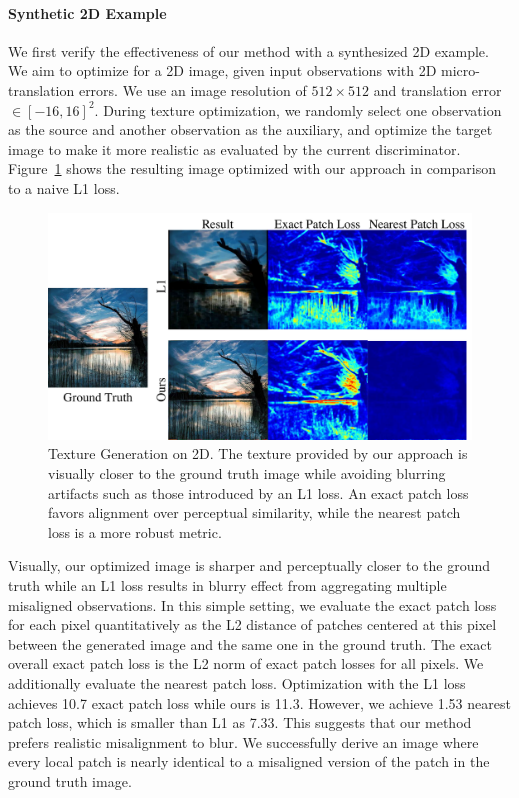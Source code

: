 \paragraph*{Synthetic 2D Example}
We first verify the effectiveness of our method with a synthesized 2D example. 
We aim to optimize for a 2D image, given input observations with 2D micro-translation errors.
We use an image resolution of $512\times 512$ and translation error $\in[-16,16]^2$. 
During texture optimization,  we  randomly select one observation as the source and another observation as the auxiliary, and optimize the target image to make it more realistic as evaluated by the current discriminator. 
Figure~\ref{fig:3dlite-2d-example} shows the resulting image optimized with our approach in comparison to a naive L1 loss.
\begin{figure}
    \centering
    \includegraphics[width=0.8\linewidth]{texturegen/figures/exp2d.pdf}
    \caption{Texture Generation on 2D. The texture provided by our approach is visually closer to the ground truth image while avoiding blurring artifacts such as those introduced by an L1 loss.
    An exact patch loss favors alignment over perceptual similarity, while the nearest patch loss is a more robust metric.
    }
    \label{fig:3dlite-2d-example}
\end{figure}

Visually, our optimized image is sharper and perceptually closer to the ground truth while an  L1 loss results in blurry effect from aggregating multiple misaligned observations. 
In this simple setting, we evaluate the exact patch loss for each pixel quantitatively as the L2 distance of patches centered at this pixel between the generated image and the same one in the ground truth. The exact overall exact patch loss is the L2 norm of exact patch losses for all pixels. We additionally evaluate the nearest patch loss.
Optimization with the L1 loss achieves 10.7 exact patch loss while ours is 11.3. However, we achieve 1.53 nearest patch loss, which is smaller than L1 as 7.33. This suggests that our method prefers realistic misalignment to blur. We successfully derive an image where every local patch is nearly identical to a misaligned version of the patch in the ground truth image.

